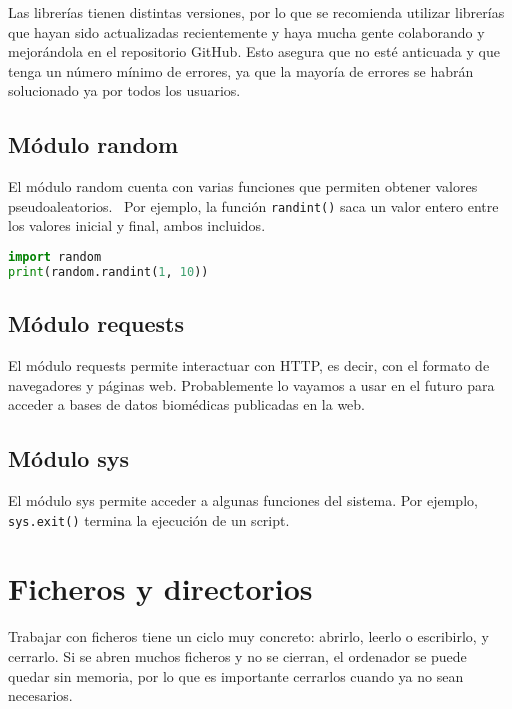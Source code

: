 Las librerías tienen distintas versiones, por lo que se recomienda utilizar librerías que hayan sido actualizadas recientemente y haya mucha gente colaborando y mejorándola en el repositorio GitHub. Esto asegura que no esté anticuada y que tenga un número mínimo de errores, ya que la mayoría de errores se habrán solucionado ya por todos los usuarios. 

\subsection{Módulo random}
El módulo random cuenta con varias funciones que permiten obtener valores pseudoaleatorios.   \ Por ejemplo, la función \texttt{randint()} saca un valor entero entre los valores inicial y final, ambos incluidos. 
\begin{lstlisting}[language=Python]
import random
print(random.randint(1, 10)) 
\end{lstlisting}

\subsection{Módulo requests}
El módulo requests permite interactuar con HTTP, es decir, con el formato de navegadores y páginas web. Probablemente lo vayamos a usar en el futuro para acceder a bases de datos biomédicas publicadas en la web. 

\subsection{Módulo sys}
El módulo sys permite acceder a algunas funciones del sistema. Por ejemplo, \texttt{sys.exit()} termina la ejecución de un script.

\section{Ficheros y directorios}
Trabajar con ficheros tiene un ciclo muy concreto: abrirlo, leerlo o escribirlo, y cerrarlo. Si se abren muchos ficheros y no se cierran, el ordenador se puede quedar sin memoria, por lo que es importante cerrarlos cuando ya no sean necesarios. 

